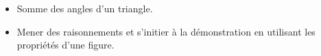 \begin{prerequis}
    \begin{itemize}        
        \item[\emoji{red-heart}] Somme des angles d'un triangle.
        \columnbreak
        \item[\emoji{diamond-suit}] Mener des raisonnements et s'initier à la démonstration en utilisant les propriétés d'une figure.
    \end{itemize}
\end{prerequis}